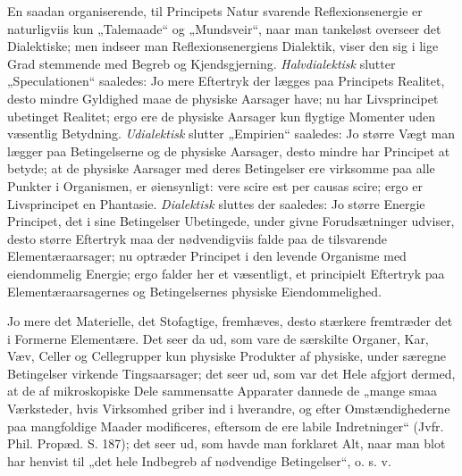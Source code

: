\documentclass[12pt,a4paper]{book}
\begin{document}
En saadan organiserende, til Principets Natur svarende
Reflexionsenergie er naturligviis kun „Talemaade“ og „Mundsveir“, naar
man tankeløst overseer det Dialektiske; men indseer man
Reflexionsenergiens Dialektik, viser den sig i lige Grad stemmende med
Begreb og Kjendsgjerning. \emph{Halvdialektisk} slutter „Speculationen“
saaledes: Jo mere Eftertryk der lægges paa Principets Realitet, desto
mindre Gyldighed maae de physiske Aarsager have; nu har Livsprincipet
ubetinget Realitet; ergo ere de physiske Aarsager kun flygtige Momenter
uden væsentlig Betydning. \emph{Udialektisk} slutter „Empirien“
saaledes: Jo større Vægt man lægger paa Betingelserne og de physiske
Aarsager, desto mindre har Principet at betyde; at de physiske Aarsager
med deres Betingelser ere virksomme paa alle Punkter i Organismen, er
øiensynligt: vere scire est per causas scire; ergo er Livsprincipet en
Phantasie. \emph{Dialektisk} sluttes der saaledes: Jo større Energie
Principet, det i sine Betingelser Ubetingede, under givne Forudsætninger
udviser, desto større Eftertryk maa der nødvendigviis falde paa de
tilsvarende Elementæraarsager; nu optræder Principet i den levende
Organisme med eiendommelig Energie; ergo falder her et væsentligt, et
principielt Eftertryk paa Elementæraarsagernes og Betingelsernes
physiske Eiendommelighed.

Jo mere det Materielle, det Stofagtige, fremhæves, desto stærkere
fremtræder det i Formerne Elementære. Det seer da ud, som vare de
særskilte Organer, Kar, Væv, Celler og
\setcounter{footnote}{0}
Cellegrupper kun physiske Produkter af physiske, under særegne
Betingelser virkende Tingsaarsager; det seer ud, som var det Hele
afgjort dermed, at de af mikroskopiske Dele sammensatte Apparater
dannede de „mange smaa Værksteder, hvis Virksomhed griber ind i
hverandre, og efter Omstændighederne paa mangfoldige Maader modificeres,
eftersom de ere labile Indretninger“ (Jvfr. Phil. Propæd. S. 187); det
seer ud, som havde man forklaret Alt, naar man blot har henvist til
„det hele Indbegreb af nødvendige Betingelser“, o. s. v.
\end{document}
